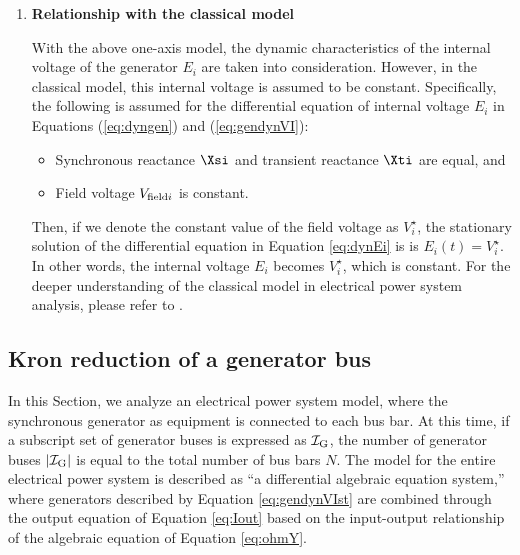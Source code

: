 \documentclass[graybox, envcountchap]{svmult}
\begin{document}
\begin{enumerate}[label=\textbf{(\arabic*)}]
  \bigskip
  \item \textbf{Relationship with the classical model}
  
  With the above one-axis model, the dynamic characteristics of the internal
  voltage of the generator $E_i$ are taken into consideration. However, in the
  classical model, this internal voltage is assumed to be constant.
  Specifically, the following is assumed for the differential equation of
  internal voltage $E_i$ in Equations (\ref{eq:dyngen}) and (\ref{eq:gendynVI}):

  \begin{itemize}
    \item Synchronous reactance $\Xsi$ and transient reactance $\Xti$ are equal, and
    \item Field voltage $V_{{\rm field}i}$ is constant.
  \end{itemize}

  Then, if we denote the constant value of the field voltage as $V_i^{\star}$,
  the stationary solution of the differential equation in Equation
  \ref{eq:dynEi} is is $E_i(t)=V_i^{\star}$. In other words, the internal
  voltage $E_i$ becomes $V_i^{\star}$, which is constant. For the deeper
  understanding of the classical model in electrical power system analysis,
  please refer to \cite[Section 2.11]{anderson2008power}.
\end{enumerate}

\subsection{Kron reduction of a generator bus}\label{sec:allgen}

In this Section, we analyze an electrical power system model, where the synchronous generator as equipment is connected to each bus bar. 
At this time, if a subscript set of generator buses is expressed as $\mathcal{I}_{\rm G}$, the number of generator buses $|\mathcal{I}_{\rm G}|$ is equal to the total number of bus bars $N$.
The model for the entire electrical power system is described as “a differential algebraic equation system,” where generators described by Equation \ref{eq:gendynVIst} are combined through the output equation of Equation \ref{eq:Iout} based on the input-output relationship of the algebraic equation of Equation \ref{eq:ohmY}.
 
\end{document}
